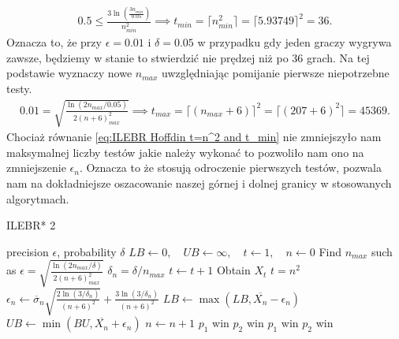 \documentclass[inzynierska]{pwr_wmat_praca_dyplomowa}
\theoremstyle{plain}
\numberwithin{theorem}{chapter}
\theoremstyle{definition}
\numberwithin{theorem}{chapter}
\begin{document}
	\begin{gather*}
		\label{eq:ILEBR Bernstein t=n^2}
		0.5 \le \frac{3  \ln(\frac{3n_{min}}{0.05})}{n_{min}^2}\implies t_{min} = \lceil n_{min}^2 \rceil = \lceil5.93749\rceil^2= 36. 
	\end{gather*}
	Oznacza to, że przy $\epsilon=0.01$ i $\delta= 0.05$ w przypadku gdy jeden graczy wygrywa zawsze, będziemy w stanie to stwierdzić nie prędzej niż po 36 grach.
	Na tej podstawie wyznaczy nowe $n_{max}$ uwzględniając pomijanie pierwsze niepotrzebne testy.
	\begin{gather}
		\label{eq:ILEBR Hoffdin t=n^2 and t_min}
		0.01 =  \sqrt{\frac{\ln(2n_{max}/0.05)}{2(n+6)_{max}^2}} \implies t_{max} = \lceil (n_{max}+6)\rceil^2 = \lceil(207+6)^2\rceil= 45369.
	\end{gather}
	Chociaż równanie \ref{eq:ILEBR Hoffdin t=n^2 and t_min} nie zmniejszyło nam maksymalnej liczby testów jakie należy wykonać to pozwoliło nam ono na zmniejszenie $\epsilon_n$. Oznacza to że stosują odroczenie pierwszych testów, pozwala nam na dokładniejsze oszacowanie naszej górnej i dolnej granicy w stosowanych algorytmach.
	\begin{algorithm}[H]\captionsetup{labelformat=custom2}
		\caption{ILEBR* 2}\label{alg:IEBLR* 2}
		\begin{algorithmic}
			\Ensure precision $\epsilon$, probability $\delta$ 
			\State  $ LB \gets 0,\quad UB \gets \infty,\quad t \gets 1,\quad n \gets 0 $
			\State Find $n_{max}$ such as $		\epsilon =  \sqrt{\frac{\ln(2n_{max}/\delta)}{2(n+6)_{max}^2}} $
			\Statex $\delta_n = \delta/n_{max}$
			\Repeat 
			\State $t \gets t + 1$
			\State Obtain $X_t$
			\Until $t=n^2$
			\State $\epsilon_n \gets \overline{\sigma}_n \sqrt{\frac{2\ln(3/\delta_n)}{(n+6)^2}} + \frac{3  \ln{(3 / \delta_n)}}{(n+6)^2}$ 
			\State $LB \gets \max(LB,  \overline{X_n} - \epsilon_n)$
			\State $UB \gets \min(BU,  \overline{X_n} + \epsilon_n)$
			\State $n \gets n + 1$
			\EndWhile
			\State \Return $p_1$ win
			\State \Return $p_2$ win
			\State \Return $p_1$ win
			\Else
			\State \Return $p_2$ win
			\EndIf
		\end{algorithmic}
	\end{algorithm}
	\newpage
\end{document}
